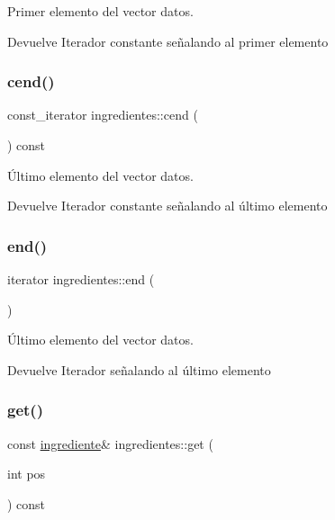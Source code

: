Primer elemento del vector datos. 

\begin{DoxyReturn}{Devuelve}
Iterador constante señalando al primer elemento 
\end{DoxyReturn}
\mbox{\label{classingredientes_a5149813ebd368e888102e69b3d9c54e8}} 
\subsubsection{\texorpdfstring{cend()}{cend()}}
{\footnotesize\ttfamily const\+\_\+iterator ingredientes\+::cend (\begin{DoxyParamCaption}{ }\end{DoxyParamCaption}) const\hspace{0.3cm}{\ttfamily [inline]}}



Último elemento del vector datos. 

\begin{DoxyReturn}{Devuelve}
Iterador constante señalando al último elemento 
\end{DoxyReturn}
\mbox{\label{classingredientes_a52a01bdabf8b52426c12976badcee775}} 
\subsubsection{\texorpdfstring{end()}{end()}}
{\footnotesize\ttfamily iterator ingredientes\+::end (\begin{DoxyParamCaption}{ }\end{DoxyParamCaption})\hspace{0.3cm}{\ttfamily [inline]}}



Último elemento del vector datos. 

\begin{DoxyReturn}{Devuelve}
Iterador señalando al último elemento 
\end{DoxyReturn}
\mbox{\label{classingredientes_a2d4257359160b39365b1aac2ec6a1166}} 
\subsubsection{\texorpdfstring{get()}{get()}\hspace{0.1cm}{\footnotesize\ttfamily [1/2]}}
{\footnotesize\ttfamily const \hyperlink{classingrediente}{ingrediente}\& ingredientes\+::get (\begin{DoxyParamCaption}\item[{int}]{pos }\end{DoxyParamCaption}) const}



